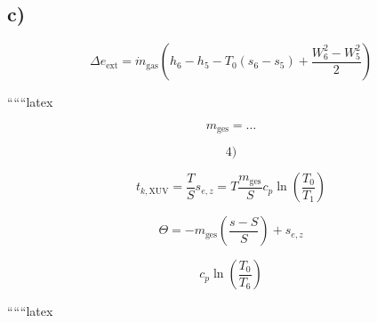 

\subsection*{c)}

\[
\Delta e_{\text{ext}} = \dot{m}_{\text{gas}} \left( h_6 - h_5 - T_0 (s_6 - s_5) + \frac{W_6^2 - W_5^2}{2} \right)
\]

``````latex

\[
m_{\text{ges}} = \dots
\]

\[
4)
\]

\[
t_{k, \text{XUV}} = \frac{T}{S} s_{e, z} = T \frac{m_{\text{ges}}}{S} c_p \ln \left( \frac{T_0}{T_1} \right)
\]

\[
\Theta = -m_{\text{ges}} \left( \frac{s - S}{S} \right) + s_{e, z}
\]

\[
c_p \ln \left( \frac{T_0}{T_6} \right)
\]

``````latex